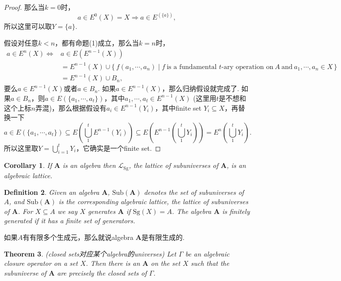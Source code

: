 \documentclass{article}
\newtheorem{theorem}{Theorem}[section]
\newtheorem{corollary}[theorem]{Corollary}
\newtheorem{definition}[theorem]{Definition}
\newcommand\Set[2]{\{\,#1\mid#2\,\}} %
\newcommand\Sg{\text{Sg}}
\newcommand\algebra{\mathbf{A}}
\newcommand\Sub[1]{\text{Sub}(#1)}
\begin{document}
\begin{proof}
那么当$k=0$时，
$$
a \in E^0(X) = X  \Rightarrow a \in E^(\{a\}),
$$
所以这里可以取$Y = \{a\}$.

假设对任意$k < n$，都有命题(1)成立，那么当$k=n$时，
$$
\begin{aligned}
a \in E^n(X) \Leftrightarrow& a \in E(E^{n-1}(X))\\ &= E^{n-1}(X) \cup \Set{f(a_1,\cdots,a_n)}{f\ \text{is a fundamental $t$-ary operation on}\ A\ \text{and}\ a_1,\cdots,a_n \in X}\\ &= E^{n-1}(X) \cup B_n,
\end{aligned}
$$
要么$a \in E^{n-1}(X)$或者$a \in B_n$. 如果$a \in E^{n-1}(X)$，那么归纳假设就完成了. 如果$a \in B_n$，则$a \in E(\{a_1,\cdots,a_t\})$，其中$a_1,\cdots,a_t \in E^{n-1}(X)$ (这里用$t$是不想和这个上标$n$弄混)，那么根据假设有$a_i \in E^{n-1}(Y_i)$，其中finite set $Y_i \subseteq X$，再替换一下
$$
a \in E(\{a_1,\cdots,a_t\}) \subseteq  E(\bigcup\limits_{1}^{t} E^{n-1}(Y_i))  \subseteq E(E^{n-1}(\bigcup\limits_{1}^{t} Y_i)) = E^n(\bigcup\limits_{1}^{t} Y_i).
$$
所以这里取$Y = \bigcup\limits_{i=1}^{t} Y_i$，它确实是一个finite set.

\end{proof}

\begin{corollary}
\rm If $\mathbf{A}$ is an algebra then $\mathcal{L}_{\Sg}$, the lattice of subuniverses of $\mathbf{A}$, is an algebraic lattice.
\end{corollary}

\newpage
\begin{definition}
\rm Given an algebra $\algebra$, {\color{red} $\Sub{\algebra}$} denotes the set of subuniverses of $A$, and $\Sub{\algebra}$ is the corresponding algebraic lattice, the lattice of subuniverses of $\algebra$. For $X \subseteq A$ we say $X$ generates $\algebra$ if $\Sg(X) = A$. The algebra $\algebra$ is finitely generated if it has a finite set of generators.
\end{definition}

{\color{blue} 如果$A$有有限多个生成元，那么就说algebra $\algebra$是有限生成的}.


\begin{theorem}
\rm {\color{red} (closed sets对应某个algebra的universes)} Let $\Gamma$ be an algebraic closure operator on a set $X$. Then there is an $\algebra$ on the set $X$ such that the subuniverse of $\algebra$ are precisely the closed sets of $\Gamma$.
\end{theorem}
\end{document}
